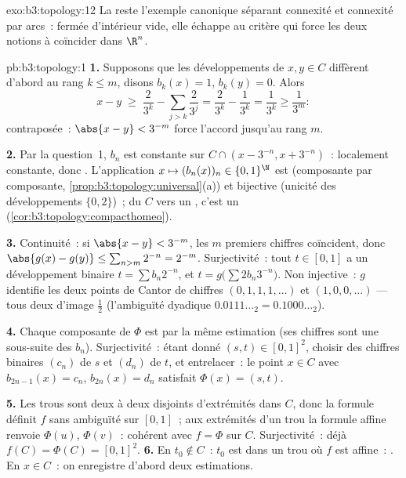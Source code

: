 \begin{solution}{exo:b3:topology:12}
La  reste l'exemple canonique séparant
connexité et connexité par arcs~: fermée d'intérieur vide, elle
échappe au critère  qui force les deux notions à
coïncider dans $\R^n$.

\end{solution}
\begin{solution}{pb:b3:topology:1}
\textbf{1.} Supposons que les développements de $x, y \in C$
diffèrent d'abord au rang $k \leq m$, disons $b_k(x) = 1$,
$b_k(y) = 0$. Alors
\[
x - y \;\geq\; \frac{2}{3^k} - \sum_{j > k}\frac{2}{3^j}
= \frac{2}{3^k} - \frac{1}{3^k} = \frac1{3^k} \geq \frac1{3^m}:
\]
contraposée~: $\abs{x - y} < 3^{-m}$ force l'accord jusqu'au
rang $m$.

\textbf{2.} Par la question~1, $b_n$ est constante sur $C \cap
(x - 3^{-n}, x + 3^{-n})$~: localement constante, donc
. L'application $x \mapsto (b_n(x))_n \in \{0,1\}^\N$
est  (composante par composante,
\cref{prop:b3:topology:universal}(a)) et bijective
(unicité des développements $\{0,2\}$)~; du  $C$ vers
un , c'est un 
(\cref{cor:b3:topology:compacthomeo}).

\textbf{3.} Continuité~: si $\abs{x - y} < 3^{-m}$, les $m$
premiers chiffres coïncident, donc $\abs{g(x) - g(y)} \leq
\sum_{n > m}2^{-n} = 2^{-m}$. Surjectivité~: tout $t \in
[0,1]$ a un développement binaire $t = \sum b_n2^{-n}$, et $t
= g\bigl(\sum 2b_n3^{-n}\bigr)$. Non injective~: $g$ identifie
les deux points de Cantor de chiffres $(0,1,1,1,\dots)$ et
$(1,0,0,\dots)$ --- tous deux d'image $\frac12$ (l'ambiguïté
dyadique $0.0111\ldots_2 = 0.1000\ldots_2$).

\textbf{4.} Chaque composante de $\Phi$ est  par la
même estimation (ses chiffres sont une sous-suite des $b_n$).
Surjectivité~: étant donné $(s, t) \in [0,1]^2$, choisir des
chiffres binaires $(c_n)$ de $s$ et $(d_n)$ de $t$, et
entrelacer~: le point $x \in C$ avec $b_{2n-1}(x) = c_n$,
$b_{2n}(x) = d_n$ satisfait $\Phi(x) = (s,t)$.

\textbf{5.} Les trous sont deux à deux disjoints d'extrémités
dans $C$, donc la formule définit $f$ sans ambiguïté sur
$[0,1]$~; aux extrémités d'un trou la formule affine renvoie
$\Phi(u)$, $\Phi(v)$~: cohérent avec $f = \Phi$ sur $C$.
Surjectivité~: déjà $f(C) = \Phi(C) = [0,1]^2$.
\textbf{6.} En $t_0 \notin C$~: $t_0$ est dans un trou 
où $f$ est affine~: . En $x \in C$~: on enregistre
d'abord deux estimations.


\end{solution}
